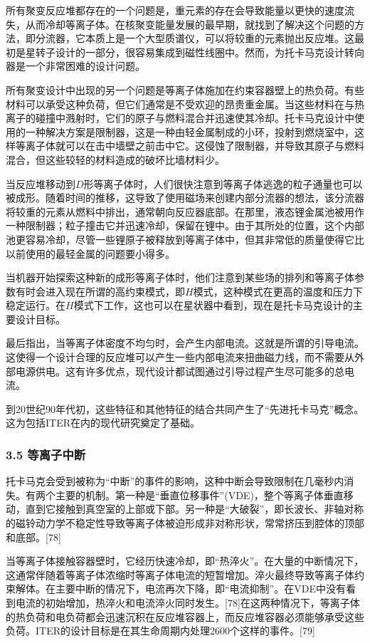 所有聚变反应堆都存在的一个问题是，重元素的存在会导致能量以更快的速度流失，从而冷却等离子体。在核聚变能量发展的最早期，就找到了解决这个问题的方法，即分流器，它本质上是一个大型质谱仪，可以将较重的元素抛出反应堆。这最初是星转子设计的一部分，很容易集成到磁性线圈中。然而，为托卡马克设计转向器是一个非常困难的设计问题。

所有聚变设计中出现的另一个问题是等离子体施加在约束容器壁上的热负荷。有些材料可以承受这种负荷，但它们通常是不受欢迎的昂贵重金属。当这些材料在与热离子的碰撞中溅射时，它们的原子与燃料混合并迅速使其冷却。托卡马克设计中使用的一种解决方案是限制器，这是一种由轻金属制成的小环，投射到燃烧室中，这样等离子体就可以在击中墙壁之前击中它。这侵蚀了限制器，并导致其原子与燃料混合，但这些较轻的材料造成的破坏比墙材料少。

当反应堆移动到$D$形等离子体时，人们很快注意到等离子体逃逸的粒子通量也可以被成形。随着时间的推移，这导致了使用磁场来创建内部分流器的想法，该分流器将较重的元素从燃料中排出，通常朝向反应器底部。在那里，液态锂金属池被用作一种限制器；粒子撞击它并迅速冷却，保留在锂中。由于其所处的位置，这个内部池更容易冷却，尽管一些锂原子被释放到等离子体中，但其非常低的质量使得它比以前使用的最轻金属的问题要小得多。

当机器开始探索这种新的成形等离子体时，他们注意到某些场的排列和等离子体参数有时会进入现在所谓的高约束模式，即$H$模式，这种模式在更高的温度和压力下稳定运行。在$H$模式下工作，这也可以在星状器中看到，现在是托卡马克设计的主要设计目标。

最后指出，当等离子体密度不均匀时，会产生内部电流。这就是所谓的引导电流。这使得一个设计合理的反应堆可以产生一些内部电流来扭曲磁力线，而不需要从外部电源供电。这有许多优点，现代设计都试图通过引导过程产生尽可能多的总电流。

到20世纪90年代初，这些特征和其他特征的结合共同产生了“先进托卡马克”概念。这为包括ITER在内的现代研究奠定了基础。
\subsubsection{3.5 等离子中断}
托卡马克会受到被称为“中断”的事件的影响，这种中断会导致限制在几毫秒内消失。有两个主要的机制。第一种是“垂直位移事件”(VDE)，整个等离子体垂直移动，直到它接触到真空室的上部或下部。另一种是“大破裂”，即长波长、非轴对称的磁铃动力学不稳定性导致等离子体被迫形成非对称形状，常常挤压到腔体的顶部和底部。[78]

当等离子体接触容器壁时，它经历快速冷却，即“热淬火”。在大量的中断情况下，这通常伴随着等离子体浓缩时等离子体电流的短暂增加。淬火最终导致等离子体约束解体。在主要中断的情况下，电流再次下降，即“电流抑制”。在VDE中没有看到电流的初始增加，热淬火和电流淬火同时发生。[78]在这两种情况下，等离子体的热负荷和电负荷都会迅速沉积在反应堆容器上，而反应堆容器必须能够承受这些负荷。ITER的设计目标是在其生命周期内处理2600个这样的事件。[79]

